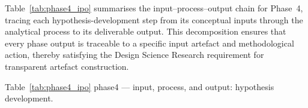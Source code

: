 \normalsize\normalfont\color{black}

Table~\ref{tab:phase4_ipo} summarises the input--process--output chain for Phase~4, tracing each hypothesis-development step from its conceptual inputs through the analytical process to its deliverable output. This decomposition ensures that every phase output is traceable to a specific input artefact and methodological action, thereby satisfying the Design Science Research requirement for transparent artefact construction.

\begingroup\singlespacing\tablefontsize\tablestripes
\noindent Table~\ref{tab:phase4_ipo} phase4 --- input, process, and output: hypothesis development.


